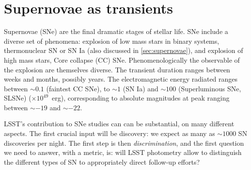 %
%
%
%
%
%
%
%

\section{Supernovae as transients}
\def\secname{SNtransients}\label{sec:\secname} %


Supernovae (SNe) are the final dramatic stages of stellar life. SNe include a diverse set of phenomena: explosion of low mass stars in binary systems, thermonuclear SN or SN Ia (also discussed in \ref{sec:supernovae}), and explosion of high mass stars, Core collapse (CC) SNe. Phenomenologically the observable of the explosion are themselves diverse.  The transient duration ranges between weeks and months, possibly years. The electromagnetic energy radiated ranges between $\sim0.1$ (faintest CC SNe), to $\sim1$ (SN Ia) and $\sim100$ (Superluminous SNe, SLSNe) ($\times 10^{49}$~erg), corresponding to absolute magnitudes at peak ranging between $\sim-19$ and $\sim-22$.

LSST's contribution to SNe studies can can be substantial, on many different aspects. The first crucial input will be discovery: we expect as many as $\sim 1000$ SN discoveries per night. The first step is then \emph{discrimination}, and the first question we need to answer, with a metric, is: will LSST photometry allow to distinguish the different types of SN to appropriately direct follow-up efforts?

